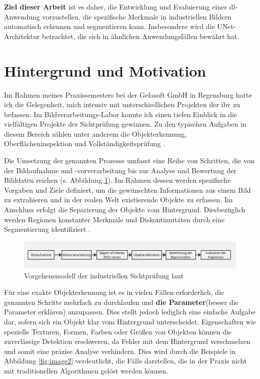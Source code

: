 \textbf{Ziel dieser Arbeit} ist es daher, die Entwicklung und Evaluierung einer \gls{dl}-Anwendung vorzustellen, die spezifische Merkmale in industriellen Bildern automatisch erkennen und segmentieren kann. Insbesondere wird die UNet-Architektur betrachtet, die sich in ähnlichen Anwendungsfällen bewährt hat.

\section{Hintergrund und Motivation }\label{motivation}

Im Rahmen meines Praxissemesters bei der Gefasoft GmbH in Regensburg hatte ich die Gelegenheit, mich intensiv mit unterschiedlichen Projekten der \gls{ibv} zu befassen. Im Bildverarbeitungs-Labor konnte ich einen tiefen Einblick in die vielfältigen Projekte der Sichtprüfung gewinnen. Zu den typischen Aufgaben in diesem Bereich zählen unter anderem die Objekterkennung, Oberflächeninspektion und Vollständigkeitsprüfung \cite[S. 5]{demant_industrielle_2011}.

Die Umsetzung der genannten Prozesse umfasst eine Reihe von Schritten, die von der Bildaufnahme und -vorverarbeitung bis zur Analyse und Bewertung der Bilddaten reichen (s. Abbildung \ref{fig:vorgehensmodell}). Im Rahmen dessen werden spezifische Vorgaben und Ziele definiert, um die gewünschten Informationen aus einem Bild zu extrahieren und in der realen Welt existierende Objekte zu erfassen. Im Anschluss erfolgt die Separierung der Objekte vom Hintergrund. Diesbezüglich werden Regionen konstanter Merkmale und Diskontinuitäten durch eine Segmentierung identifiziert \cite[S.13]{jahne_digitale_2024}.

\begin{figure}[h]
    \centering
    \includegraphics[width=1\linewidth]{expose/Vorgehensmodell_IBV.jpg}
    \caption{Vorgehensmodell der industriellen Sichtprüfung laut \cite[S.15]{demant_industrielle_2011}}
    \label{fig:vorgehensmodell}
\end{figure}

Für eine exakte Objekterkennung ist es in vielen Fällen erforderlich, die genannten Schritte mehrfach zu durchlaufen und \textbf{die Parameter}(besser die Parameter erklären) anzupassen. Dies stellt jedoch lediglich eine einfache Aufgabe dar, sofern sich ein Objekt klar vom Hintergrund unterscheidet. Eigenschaften wie spezielle Texturen, Formen, Farben oder Größen von Objekten können die zuverlässige Detektion erschweren, da Fehler mit dem Hintergrund verschmelzen und somit eine präzise Analyse verhindern. Dies wird durch die Beispiele in Abbildung \ref{fig:image2} verdeutlicht, die Fälle darstellen, die in der Praxis nicht mit traditionellen Algorithmen gelöst werden können.

